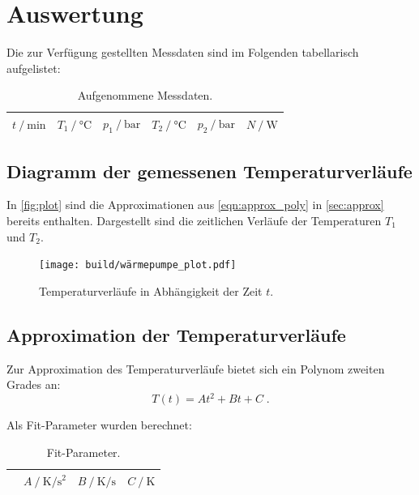 \section{Auswertung} \label{sec:Auswertung}
Die zur Verfügung gestellten Messdaten sind im Folgenden tabellarisch aufgelistet:

\begin{table}[H]
\centering
\caption{Aufgenommene Messdaten.}
\label{tab:Messdaten}
\begin{tabular}{c c c c c c}
\toprule
$t \mathbin{/} \si{\minute}$ &
$T_1 \mathbin{/} \si{\celsius}$ &
$p_1 \mathbin{/} \si{\bar}$ &
$T_2 \mathbin{/} \si{\celsius}$ &
$p_2 \mathbin{/} \si{\bar}$ &
$N \mathbin{/} \si{\watt}$ \\
\midrule

\bottomrule
\end{tabular}
\end{table}

\newpage
\subsection{Diagramm der gemessenen Temperaturverläufe} %
In \autoref{fig:plot} sind die Approximationen aus \autoref{eqn:approx_poly} in \autoref{sec:approx} bereits enthalten.
Dargestellt sind die zeitlichen Verläufe der Temperaturen $T_1$ und $T_2$.

\begin{figure}
  \centering
  \texttt{[image: build/wärmepumpe\_plot.pdf]}
  \caption{Temperaturverläufe in Abhängigkeit der Zeit $t$.}
  \label{fig:plot}
\end{figure}

\subsection{Approximation der Temperaturverläufe} \label{sec:approx} %
Zur Approximation des Temperaturverläufe bietet sich ein Polynom zweiten Grades an:
\begin{equation}
  \label{eqn:approx_poly}
  T(t) = At^2 + Bt + C \; .
\end{equation}

Als Fit-Parameter wurden berechnet:

\begin{table}[H]
\centering
\caption{Fit-Parameter.}
\label{tab:fit_params}
\begin{tabular}{c c c c}
\toprule
&
$A \mathbin{/} \si{\kelvin\per\square\second}$ &
$B \mathbin{/} \si{\kelvin\per\second}$ &
$C \mathbin{/} \si{\kelvin}$ \\
\midrule

\bottomrule
\end{tabular}
\end{table}

